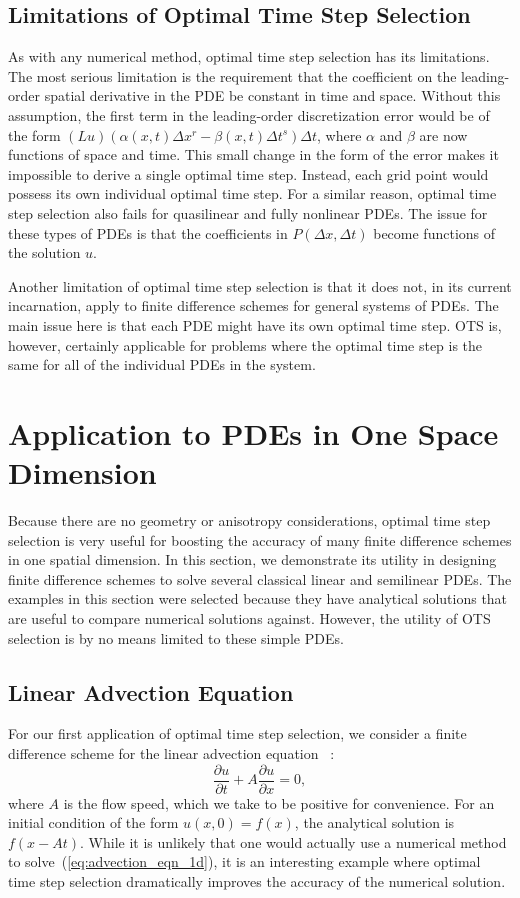 \documentclass[fleqn,12pt,twoside]{article}
\newcommand{\beq}{\begin{equation}}
\newcommand{\eeq}{\end{equation}}
\def\dt{\Delta t}
\def\dx{\Delta x}
\begin{document}
\subsection{Limitations of Optimal Time Step Selection}
As with any numerical method, optimal time step selection has its limitations.
The most serious limitation is the requirement that the coefficient on the 
leading-order spatial derivative in the PDE be constant in time and space.  
Without this assumption, the first term in the leading-order discretization 
error would be of the form 
$(L u) (\alpha(x,t) \dx^r - \beta(x,t) \dt^s) \dt$,
where $\alpha$ and $\beta$ are now functions of space and time.  This
small change in the form of the error makes it impossible to derive a single 
optimal time step.  Instead, each grid point would possess its own individual 
optimal time step.  For a similar reason, optimal time step selection also 
fails for quasilinear and fully nonlinear PDEs.  The issue for these types of 
PDEs is that the coefficients in $P(\dx, \dt)$ become functions of the 
solution $u$.

Another limitation of optimal time step selection is that it does not,
in its current incarnation, apply to finite difference schemes for general
systems of PDEs.  The main issue here is that each PDE might have its 
own optimal time step.  OTS is, however, certainly applicable for problems 
where the optimal time step is the same for all of the individual PDEs in the 
system.


\section{\label{sec:applications_1d} 
         Application to PDEs in One Space Dimension}
Because there are no geometry or anisotropy considerations, optimal time step 
selection is very useful for boosting the accuracy of many finite difference 
schemes in one spatial dimension.  In this section, we demonstrate its 
utility in designing finite difference schemes to solve several classical 
linear and semilinear PDEs.  The examples in this section were selected 
because they have analytical solutions that are useful to compare numerical 
solutions against.  However, the utility of OTS selection is by no means 
limited to these simple PDEs.


\subsection{Linear Advection Equation}
For our first application of optimal time step selection, we consider 
a finite difference scheme for the linear advection equation
~\cite{gko_book,leveque_book_1992,leveque_book_2002}:
\beq
  \frac{\partial u}{\partial t} + A \frac{\partial u}{\partial x} = 0,
  \label{eq:advection_eqn_1d}
\eeq
where $A$ is the flow speed, which we take to be positive for convenience.  
For an initial condition of the form $u(x,0) = f(x)$, the analytical solution 
is $f(x-At)$.  While it is unlikely that one would actually use a numerical 
method to solve~(\ref{eq:advection_eqn_1d}), it is an interesting example 
where optimal time step selection dramatically improves the accuracy of the 
numerical solution. 
\end{document}
